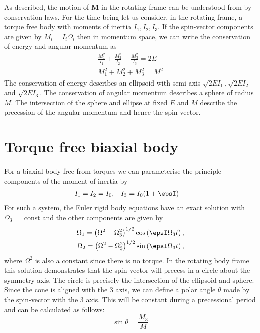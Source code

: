 \documentclass[/home/greg/Thesis/main/main.tex]{subfiles}
\begin{document}
\graphicspath{{/home/greg/Neutron_star_modelling/MotionOfARigidBody}}
\newcommand{\MotionOfARigidBodyDir}{/home/greg/Neutron_star_modelling/MotionOfARigidBody}

\FloatBarrier
As \citet{Landau1969} described, the motion of $\mathbf{M}$ in the rotating frame
can be understood from by conservation laws. For the time being let us consider,
in the rotating frame, a torque free body with moments of inertia $I_{1}, I_{2}, I_{3}$. 
If the spin-vector components are given by $M_{i} = I_{i} \Omega_{i}$ then 
in momentum space, we can write the conservation of energy and angular momentum as
\begin{align}
    \frac{M_{1}^{2}}{I_{1}} + \frac{M_{2}^{2}}{I_{2}} + \frac{M_{3}^{2}}{I_{3}} = 2E 
    \label{eqn: ellipse} \\
    M_{1}^{2} + M_{2}^{2} + M_{3}^{2} = M^{2}
    \label{eqn: sphere}
\end{align}
The conservation of energy describes an ellipsoid with semi-axis
$\sqrt{2EI_{1}}, \sqrt{2EI_{2}}$ and $\sqrt{2EI_{3}}$. The conservation of 
angular momentum describes a sphere of radius $M$. The intersection of the
sphere and ellipse at fixed $E$ and $M$ describe the precession of the angular
momentum and hence the spin-vector.

\section{Torque free biaxial body}
For a biaxial body free from torques we can parameterise the principle components
of the moment of inertia by 
\begin{align}
    I_{1} = I_{2} = I_{0}, &&& I_{3} = I_{0}(1 + \epsI)
\end{align}
For such a system, the Euler rigid body equations have an
exact solution with $\Omega_{3}=$ const and the other components are given by
\begin{align}
    \Omega_{1} = \left(\Omega^{2} - \Omega_{3}^{2}\right)^{1/2}\cos\left(\epsI \Omega_{3} t\right),\\
    \Omega_{2} = \left(\Omega^{2} - \Omega_{3}^{2}\right)^{1/2}\sin\left(\epsI \Omega_{3} t\right),
\end{align}
where $\Omega^{2}$ is also a constant since there is no torque. In the rotating
body frame this solution demonstrates that the spin-vector will precess in a
circle about the symmetry axis. The circle is precisely the intersection of the
ellipsoid and sphere. Since the cone is aligned with the $3$ axis, we can define
a polar angle $\theta$ made by the spin-vector with the $3$ axis. This will be 
constant during a precessional period and can be calculated as follows:
\begin{equation}
\sin\theta = \frac{M_{3}}{M}
\label{eqn: sin theta}
\end{equation}
\end{document}
